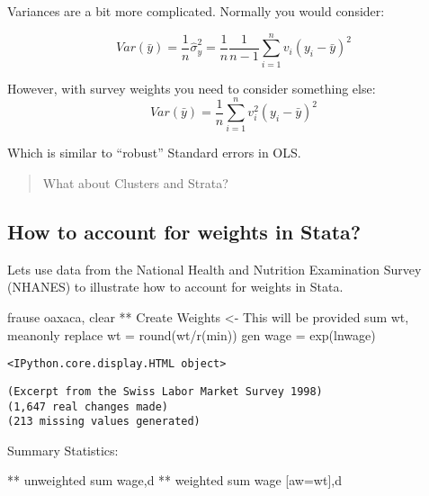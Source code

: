 \documentclass[
  letterpaper,
  DIV=11,
  numbers=noendperiod]{scrartcl}
\newenvironment{Shaded}{\begin{snugshade}}{\end{snugshade}}
\newcommand{\FunctionTok}[1]{\textcolor[rgb]{0.28,0.35,0.67}{#1}}
\newcommand{\KeywordTok}[1]{\textcolor[rgb]{0.00,0.23,0.31}{#1}}
\newcommand{\NormalTok}[1]{\textcolor[rgb]{0.00,0.23,0.31}{#1}}
\begin{document}
Variances are a bit more complicated. Normally you would consider:

\[Var(\bar y) = \frac{1}{n} \hat \sigma^2_y =\frac{1}{n} \frac{1}{n-1} \sum_{i=1}^n v_i (y_i - \bar y)^2\]

However, with survey weights you need to consider something else:
\[Var(\bar y) = \frac{1}{n} \sum_{i=1}^n v_i^2 (y_i - \bar y)^2\]

Which is similar to ``robust'' Standard errors in OLS.

\begin{quote}
What about Clusters and Strata?
\end{quote}

\subsection{How to account for weights in
Stata?}\label{how-to-account-for-weights-in-stata}

Lets use data from the National Health and Nutrition Examination Survey
(NHANES) to illustrate how to account for weights in Stata.

\begin{Shaded}
\begin{Highlighting}[]
\NormalTok{ frause oaxaca, }\KeywordTok{clear}
\NormalTok{** Create Weights \textless{}{-} This will }\KeywordTok{be}\NormalTok{ provided}
\KeywordTok{sum}\NormalTok{ wt, }\KeywordTok{meanonly}
\KeywordTok{replace}\NormalTok{ wt = }\FunctionTok{round}\NormalTok{(wt/}\FunctionTok{r}\NormalTok{(}\FunctionTok{min}\NormalTok{))}
\KeywordTok{gen}\NormalTok{ wage = }\FunctionTok{exp}\NormalTok{(lnwage)}
\end{Highlighting}
\end{Shaded}

\begin{verbatim}
<IPython.core.display.HTML object>
\end{verbatim}

\begin{verbatim}
(Excerpt from the Swiss Labor Market Survey 1998)
(1,647 real changes made)
(213 missing values generated)
\end{verbatim}

Summary Statistics:

\begin{Shaded}
\begin{Highlighting}[]
\NormalTok{** unweighted}
\KeywordTok{sum}\NormalTok{ wage,}\KeywordTok{d}
\NormalTok{** weighted}
\KeywordTok{sum}\NormalTok{ wage [aw=wt],}\KeywordTok{d}
\end{Highlighting}
\end{Shaded}
\end{document}
